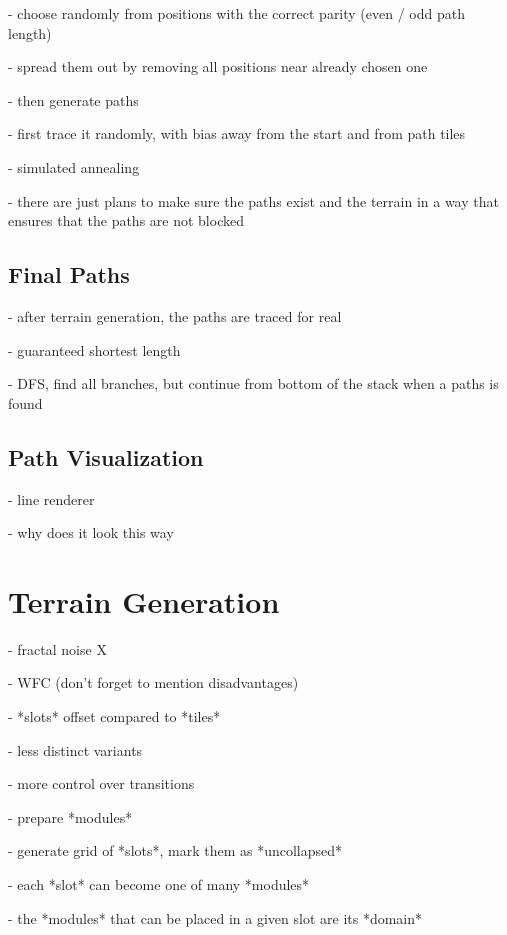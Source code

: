 - choose randomly from positions with the correct parity (even / odd path length)

- spread them out by removing all positions near already chosen one

- then generate paths

- first trace it randomly, with bias away from the start and from path tiles

- simulated annealing

- there are just plans to make sure the paths exist and the terrain in a way that ensures that the paths are not blocked

\subsection{Final Paths}

- after terrain generation, the paths are traced for real

- guaranteed shortest length

- DFS, find all branches, but continue from bottom of the stack when a paths is found

\subsection{Path Visualization}

- line renderer \checkmark

- why does it look this way

\section{Terrain Generation}

- fractal noise X

- WFC \checkmark (don't forget to mention disadvantages)



- *slots* offset compared to *tiles*

- less distinct variants

- more control over transitions

- prepare *modules*

- generate grid of *slots*, mark them as *uncollapsed*

- each *slot* can become one of many *modules*

- the *modules* that can be placed in a given slot are its *domain*

